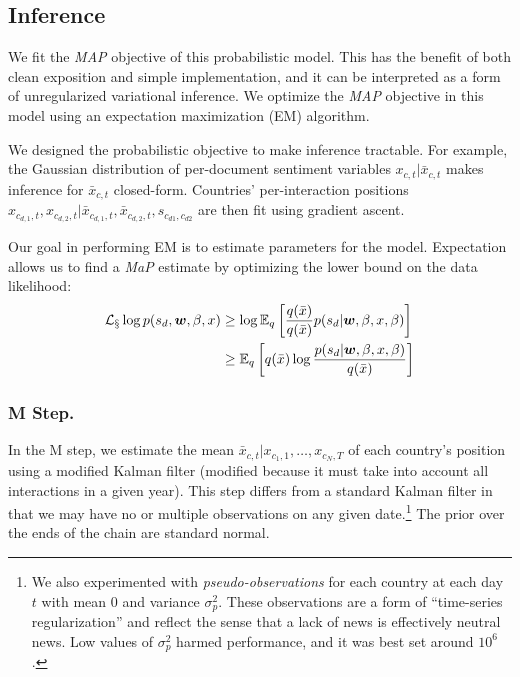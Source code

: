 
\subsection{Inference}
We fit the \emph{MAP} objective of this probabilistic model.  This has
the benefit of both clean exposition and simple implementation, and it
can be interpreted as a form of unregularized variational inference.
We optimize the \emph{MAP} objective in this model using an
expectation maximization (EM) algorithm.

We designed the probabilistic objective to make inference tractable.
For example, the Gaussian distribution of per-document sentiment
variables $x_{c, t} | \bar x_{c,t}$ makes inference for $\bar x_{c,t}$
closed-form.  Countries' per-interaction positions $x_{c_{d,1}, t},
x_{c_{d,2},t} | \bar x_{c_{d,1},t}, \bar x_{c_{d,2}, t}, s_{c_{d1},
  c_{d2}}$ are then fit using gradient ascent.

Our goal in performing EM is to estimate parameters for the model.  Expectation allows us to find a \emph{MaP} estimate by optimizing the lower bound on the data likelihood:
\begin{align}
  \mathcal{L_{x}} \log p(s_d, \bm w, \beta, x)
  & \ge \log \mathbb{E}_q\left[ \frac{q(\bar x)}{q(\bar x)}
    p(s_d | \bm w, \beta, x, \beta) \right] \nonumber \\
  & \ge \mathbb{E}_q\left[ q(\bar x)
    \log \frac{ p(s_d | \bm w, \beta, x, \beta) }{
      q(\bar x)} \right]
\end{align}

\subsubsection{M Step.} In the M step, we estimate the mean $\bar
x_{c,t} | x_{c_1,1}, \ldots, x_{c_N,T}$ of each country's position
using a modified Kalman filter (modified because it must take into
account all interactions in a given year).  This step differs from a
standard Kalman filter in that we may have no or multiple observations
on any given date.\footnote{We also experimented with
  \emph{pseudo-observations} for each country at each day $t$ with
  mean 0 and variance $\sigma_p^2$.  These observations are a form of
  ``time-series regularization'' and reflect the sense that a lack of
  news is effectively neutral news.  Low values of $\sigma_p^2$ harmed
  performance, and it was best set around $10^6$.}  The prior over the
ends of the chain are standard normal.

